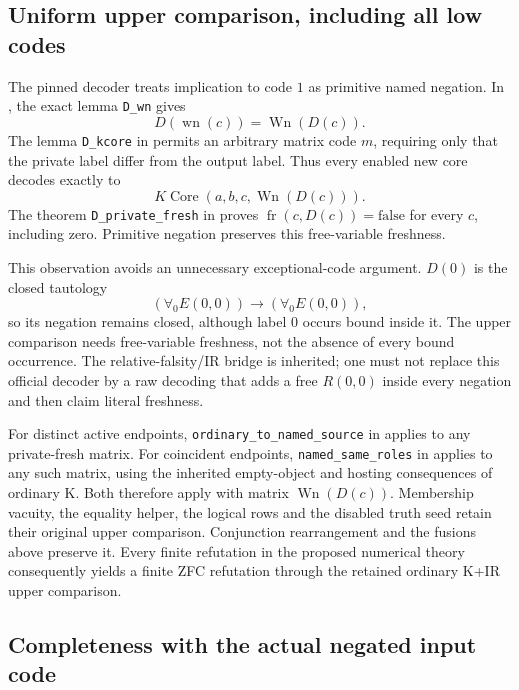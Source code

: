 \subsection{Uniform upper comparison, including all low codes}

The pinned decoder treats implication to code $1$ as primitive named
negation.  In , the exact lemma
\texttt{D\_wn} gives
\[
             D(\operatorname{wn}(c))=\operatorname{Wn}(D(c)).
\]
The lemma \texttt{D\_kcore} in
 permits an arbitrary matrix code
$m$, requiring only that the private label differ from the output label.
Thus every enabled new core decodes exactly to
\[
          K\operatorname{Core}(a,b,c,\operatorname{Wn}(D(c))).
\]
The theorem \texttt{D\_private\_fresh} in
 proves
$\operatorname{fr}(c,D(c))=\mathrm{false}$ for every $c$, including zero.
Primitive negation preserves this free-variable freshness.

This observation avoids an unnecessary exceptional-code argument.
$D(0)$ is the closed tautology
\[
 (\forall_0 E(0,0))\to(\forall_0 E(0,0)),
\]
so its negation remains closed, although label $0$ occurs bound inside
it.  The upper comparison needs free-variable freshness, not the absence
of every bound occurrence.  The relative-falsity/IR bridge is inherited;
one must not replace this official decoder by a raw decoding that adds
a free $R(0,0)$ inside every negation and then claim literal freshness.

For distinct active endpoints, \texttt{ordinary\_to\_named\_source} in
 applies to any private-fresh matrix.
For coincident endpoints, \texttt{named\_same\_roles} in
 applies to any such matrix, using
the inherited empty-object and hosting consequences of ordinary K.
Both therefore apply with matrix $\operatorname{Wn}(D(c))$.  Membership
vacuity, the equality helper, the logical rows and the disabled truth seed
retain their original upper comparison.  Conjunction rearrangement and
the fusions above preserve it.  Every finite refutation in the proposed
numerical theory consequently yields a finite ZFC refutation through the
retained ordinary K+IR upper comparison.

\subsection{Completeness with the actual negated input code}

